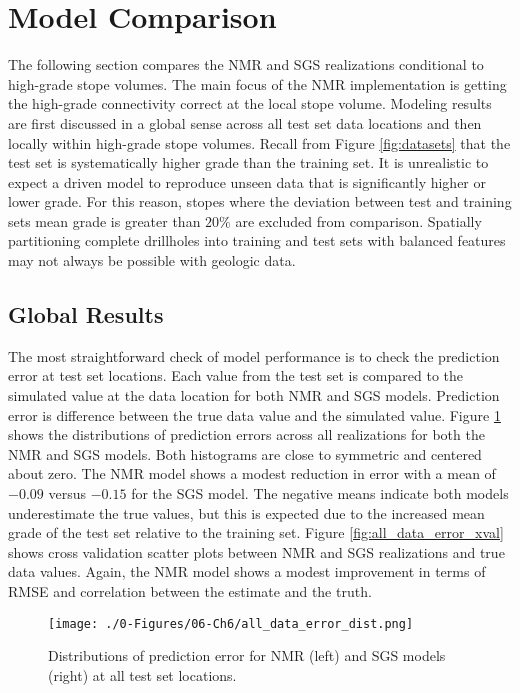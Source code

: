 \FloatBarrier
\section{Model Comparison}
\label{sec:compare}

The following section compares the \gls{NMR} and \gls{SGS} realizations conditional to high-grade stope volumes. The main focus of the \gls{NMR} implementation is getting the high-grade connectivity correct at the local stope volume. Modeling results are first discussed in a global sense across all test set data locations and then locally within high-grade stope volumes. Recall from Figure \ref{fig:datasets} that the test set is systematically higher grade than the training set. It is unrealistic to expect a driven model to reproduce unseen data that is significantly higher or lower grade. For this reason, stopes where the deviation between test and training sets mean grade is greater than $20\%$ are excluded from comparison. Spatially partitioning complete drillholes into training and test sets with balanced features may not always be possible with geologic data.

\FloatBarrier
\subsection{Global Results}
\label{subsec:global}

The most straightforward check of model performance is to check the prediction error at test set locations. Each value from the test set is compared to the simulated value at the data location for both \gls{NMR} and \gls{SGS} models. Prediction error is difference between the true data value and the simulated value. Figure \ref{fig:all_data_error_dist} shows the distributions of prediction errors across all realizations for both the \gls{NMR} and \gls{SGS} models. Both histograms are close to symmetric and centered about zero. The \gls{NMR} model shows a modest reduction in error with a mean of $-0.09$ versus $-0.15$ for the \gls{SGS} model. The negative means indicate both models underestimate the true values, but this is expected due to the increased mean grade of the test set relative to the training set. Figure \ref{fig:all_data_error_xval} shows cross validation scatter plots between \gls{NMR} and \gls{SGS} realizations and true data values. Again, the \gls{NMR} model shows a modest improvement in terms of \gls{RMSE} and correlation between the estimate and the truth.

\begin{figure}[htb!]
    \centering
    \texttt{[image: ./0-Figures/06-Ch6/all\_data\_error\_dist.png]}
    \caption{Distributions of prediction error for \gls{NMR} (left) and \gls{SGS} models (right) at all test set locations. }
    \label{fig:all_data_error_dist}
\end{figure}

